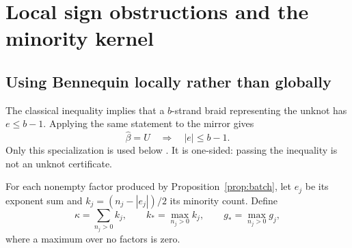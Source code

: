 \documentclass[11pt,letterpaper]{article}
\theoremstyle{definition}
\newcommand{\cl}[1]{\widehat{#1}}
\begin{document}
\section{Local sign obstructions and the minority kernel}
\label{sec:minority}

\subsection{Using Bennequin locally rather than globally}
The classical inequality implies that a $b$-strand braid representing the unknot has $e\le b-1$. Applying the same statement to the mirror gives
\begin{equation}
 \cl\beta=U\quad\Longrightarrow\quad |e|\le b-1.
 \label{eq:bennequin}
\end{equation}
Only this specialization is used below \cite{dasbachlin}. It is one-sided: passing the inequality is not an unknot certificate.

For each nonempty factor produced by Proposition~\ref{prop:batch}, let $e_j$ be its exponent sum and $k_j=(n_j-|e_j|)/2$ its minority count. Define
\begin{equation}
 \kappa=\sum_{n_j>0} k_j,\qquad
 k_* = \max_{n_j>0} k_j,\qquad
 g_* = \max_{n_j>0} g_j,
 \label{eq:localparameters}
\end{equation}
where a maximum over no factors is zero.
\end{document}
